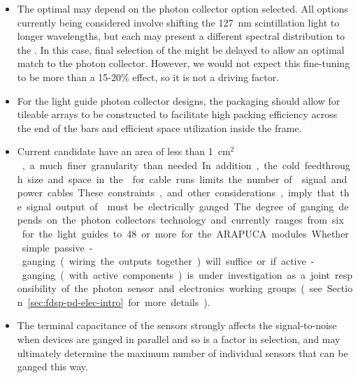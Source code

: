 \begin{itemize}
\item The optimal  may depend on the photon collector option selected.  All 
options currently being considered involve shifting the \SI{127}{nm} \lar scintillation light to 
longer wavelengths, but each may present a different  spectral distribution to the . 
In this case, final selection of the  might be delayed to allow an optimal match to the photon collector. 
However, we would not expect this fine-tuning to be more than a 15-20\% effect, so it is not a driving factor.

\item For the light guide photon collector designs, the  packaging should allow for tileable arrays to be constructed to facilitate high packing efficiency across the end of the bars and efficient space utilization inside the  frame. 

\item Current candidate  have an area of less than \SI{1}{cm$^2$}, a much finer granularity than needed. In addition, the cold feedthrough size and space in the  for cable runs limits  the number of  signal and power cables. These constraints, and other considerations, imply that the signal output of  must be electrically ganged. The degree of ganging depends on the photon collectors technology and currently ranges from six  for the light guides to \num{48} or more for the ARAPUCA modules. Whether simple passive-ganging (wiring the outputs together) will suffice or if active-ganging (with active components) is under investigation as a joint responsibility of the photon sensor and electronics working groups (see Section~\ref{sec:fdsp-pd-elec-intro} for more details).

\item The terminal capacitance of the sensors strongly affects the signal-to-noise when devices are ganged in parallel and so is a factor in  selection, and may ultimately determine the maximum number of individual sensors that can be ganged this way. 

\end{itemize}

